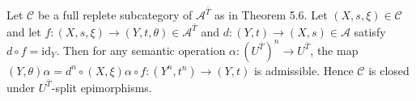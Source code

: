 Let $\mathcal{C}$ be a full replete subcategory of $\mathcal{A}^{\bar{T}}$ as in Theorem 5.6. Let $(X, s, \xi) \in \mathcal{C}$ and let $f: (X, s, \xi) \longrightarrow (Y, t, \theta) \in \mathcal{A}^{\bar{T}}$ and $d: (Y, t) \longrightarrow (X, s) \in \mathcal{A}$ satisfy $d \circ f = \mathrm{id}_Y$. Then for any semantic operation $\alpha: (U^{\bar{T}})^n \longrightarrow U^{\bar{T}}$, the map $(Y, \theta)\alpha = d^n \circ (X, \xi)\alpha \circ f: (Y^n, t^n) \longrightarrow (Y, t)$ is admissible. Hence $\mathcal{C}$ is closed under $U^{\bar{T}}$-split epimorphisms.
